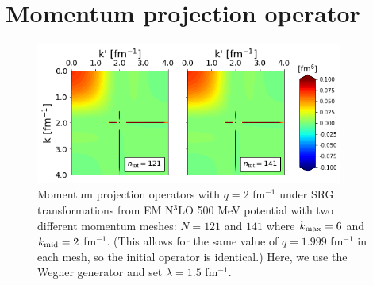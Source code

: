 \documentclass[preprintnumbers,floatfix,aps,prc,preprint,nofootinbib]{revtex4-1}
\begin{document}
\section{Momentum projection operator}
\label{sec:momentum_projection_operator}


%
\begin{figure}[tbh]
    \includegraphics[clip,clip,width=0.9\textwidth]{momentum_projection_operator_test.png}%
    \caption{Momentum projection operators with $q=2$ fm$^{-1}$ under SRG transformations from EM N$^3$LO 500 MeV potential with two different momentum meshes: $N=121$ and $141$ where $k_{\rm max}=6$ and $k_{\rm mid}=2$ fm$^{-1}$. (This allows for the same value of $q=1.999$ fm$^{-1}$ in each mesh, so the initial operator is identical.) Here, we use the Wegner generator and set $\lambda=1.5$ fm$^{-1}$.}
    \label{fig:momentum_projection_operators}
\end{figure}
%
\end{document}
